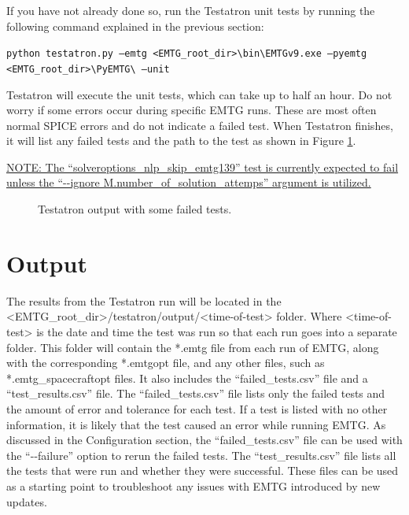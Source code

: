 \documentclass[11pt]{article}
\makeatletter
\newcommand{\knownissuelabel}[2]
{
	 \phantomsection
  	\hyperref[#2_h]{#1}\def\@currentlabel{\unexpanded{#1}}\label{#2_b}
}
\makeatother
\begin{document}
If you have not already done so, run the Testatron unit tests by running the following command explained in the previous section: 

\texttt{python testatron.py --emtg <EMTG\_root\_dir>\textbackslash bin\textbackslash EMTGv9.exe --pyemtg <EMTG\_root\_di\newline\indent r>\textbackslash PyEMTG\textbackslash{} --unit}

\noindent Testatron will execute the unit tests, which can take up to half an hour. Do not worry if some errors occur during specific \ac{EMTG} runs. These are most often normal \acs{SPICE} errors and do not indicate a failed test. When Testatron finishes, it will list any failed tests and the path to the test as shown in Figure \ref{fig:testatron_output}. 

\noindent\knownissuelabel{NOTE: The ``solveroptions\_nlp\_skip\_emtg139'' test is currently expected to fail unless the ``-{}-ignore M.number\_of\_solution\_attemps'' argument is utilized.}{known_failing_test}

\begin{figure}[H]
	\centering
	\caption{\label{fig:testatron_output}Testatron output with some failed tests.}
\end{figure}

\newpage
\section{Output}
\label{sec:output}

The results from the Testatron run will be located in the \textless EMTG\_root\_dir\textgreater /testatron/output/\textless time-of-test\textgreater{} folder. Where \textless time-of-test\textgreater{} is the date and time the test was run so that each run goes into a separate folder. This folder will contain the *.emtg file from each run of \ac{EMTG}, along with the corresponding *.emtgopt file, and any other files, such as *.emtg\_spacecraftopt files. It also includes the ``failed\_tests.csv'' file and a ``test\_results.csv'' file. The ``failed\_tests.csv'' file lists only the failed tests and the amount of error and tolerance for each test. If a test is listed with no other information, it is likely that the test caused an error while running \ac{EMTG}. As discussed in the Configuration section, the ``failed\_tests.csv'' file can be used with the ``-{}-failure'' option to rerun the failed tests. The ``test\_results.csv'' file lists all the tests that were run and whether they were successful. These files can be used as a starting point to troubleshoot any issues with \ac{EMTG} introduced by new updates.
\end{document}
